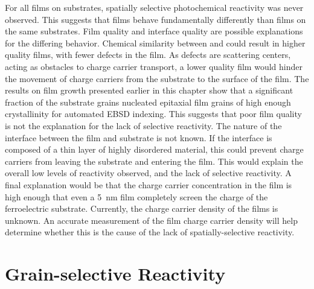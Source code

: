 For all  films on  substrates, spatially selective photochemical reactivity was never observed. This suggests that  films behave fundamentally differently than  films on the same substrates. Film quality and interface quality are possible explanations for the differing behavior. Chemical similarity between  and  could result in higher quality films, with fewer defects in the film. As defects are scattering centers, acting as obstacles to charge carrier transport, a lower quality film would hinder the movement of charge carriers from the substrate to the surface of the film. The results on  film growth presented earlier in this chapter show that a significant fraction of the substrate grains nucleated epitaxial film grains of high enough crystallinity for automated EBSD indexing. This suggests that poor film quality is not the explanation for the lack of selective reactivity. The nature of the interface between the film and substrate is not known. If the interface is composed of a thin layer of highly disordered material, this could prevent charge carriers from leaving the substrate and entering the film. This would explain the overall low levels of reactivity observed, and the lack of selective reactivity. A final explanation would be that the charge carrier concentration in the film is high enough that even a \SI{5}{\nano\meter} film completely screen the charge of the ferroelectric substrate. Currently, the charge carrier density of the  films is unknown. An accurate measurement of the film charge carrier density will help determine whether this is the cause of the lack of spatially-selective reactivity.


\section{Grain-selective Reactivity}
\label{subsec:ch6grain}


